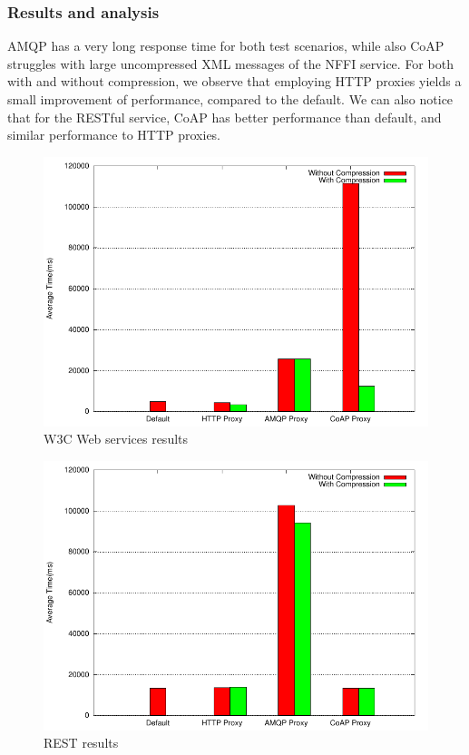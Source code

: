 \subsubsection{Results and analysis}

AMQP has a very long response time for both test scenarios, while also CoAP
struggles with large uncompressed XML messages of the NFFI service. For both
with and without compression, we observe that employing HTTP proxies yields a
small improvement of performance, compared to the default. We can also notice
that for the RESTful service, CoAP has better performance than default, and
similar performance to HTTP proxies.

\begin{figure}[H]
\center
\includegraphics[scale=0.75]{../results/satellite/nffi/result.pdf}
\caption{W3C Web services results}
\end{figure}

\begin{figure}[H]
\center
\includegraphics[scale=0.75]{../results/satellite/rest/result.pdf}
\caption{REST results}
\end{figure}

